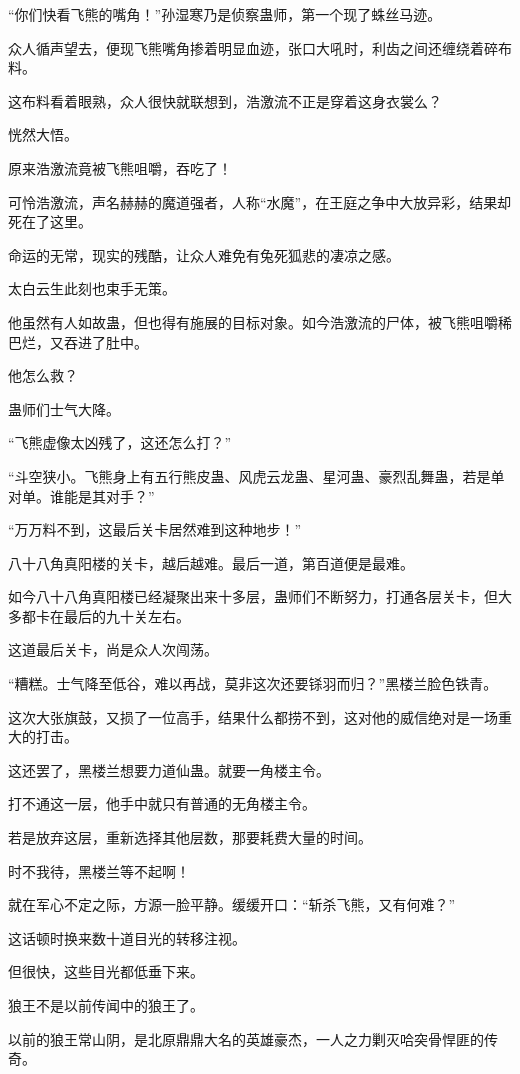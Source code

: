 \begin{this_body}
“你们快看飞熊的嘴角！”孙湿寒乃是侦察蛊师，第一个现了蛛丝马迹。

众人循声望去，便现飞熊嘴角掺着明显血迹，张口大吼时，利齿之间还缠绕着碎布料。

这布料看着眼熟，众人很快就联想到，浩激流不正是穿着这身衣裳么？

恍然大悟。

原来浩激流竟被飞熊咀嚼，吞吃了！

可怜浩激流，声名赫赫的魔道强者，人称“水魔”，在王庭之争中大放异彩，结果却死在了这里。

命运的无常，现实的残酷，让众人难免有兔死狐悲的凄凉之感。

太白云生此刻也束手无策。

他虽然有人如故蛊，但也得有施展的目标对象。如今浩激流的尸体，被飞熊咀嚼稀巴烂，又吞进了肚中。

他怎么救？

蛊师们士气大降。

“飞熊虚像太凶残了，这还怎么打？”

“斗空狭小。飞熊身上有五行熊皮蛊、风虎云龙蛊、星河蛊、豪烈乱舞蛊，若是单对单。谁能是其对手？”

“万万料不到，这最后关卡居然难到这种地步！”

八十八角真阳楼的关卡，越后越难。最后一道，第百道便是最难。

如今八十八角真阳楼已经凝聚出来十多层，蛊师们不断努力，打通各层关卡，但大多都卡在最后的九十关左右。

这道最后关卡，尚是众人次闯荡。

“糟糕。士气降至低谷，难以再战，莫非这次还要铩羽而归？”黑楼兰脸色铁青。

这次大张旗鼓，又损了一位高手，结果什么都捞不到，这对他的威信绝对是一场重大的打击。

这还罢了，黑楼兰想要力道仙蛊。就要一角楼主令。

打不通这一层，他手中就只有普通的无角楼主令。

若是放弃这层，重新选择其他层数，那要耗费大量的时间。

时不我待，黑楼兰等不起啊！

就在军心不定之际，方源一脸平静。缓缓开口：“斩杀飞熊，又有何难？”

这话顿时换来数十道目光的转移注视。

但很快，这些目光都低垂下来。

狼王不是以前传闻中的狼王了。

以前的狼王常山阴，是北原鼎鼎大名的英雄豪杰，一人之力剿灭哈突骨悍匪的传奇。


\end{this_body}
